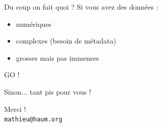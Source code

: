 \documentclass[10pt]{beamer}
\begin{document}
\begin{frame}{Du coup on fait quoi ?}
	Si vous avez des données :

	\begin{itemize}
		\item numériques
		\item complexes (besoin de métadata)
		\item grosses mais pas immenses
	\end{itemize}

	\begin{center}
		\textcolor{KTHBlue}{GO !}
	\end{center}

	Sinon... tant pis pour vous !
\end{frame}

\begin{frame}[standout] %
	\vspace{0.05\textwidth}
	Merci !\\
	\vspace{0.25\textwidth}
	\small{\texttt{mathieu@haum.org}}
\end{frame}
\end{document}
